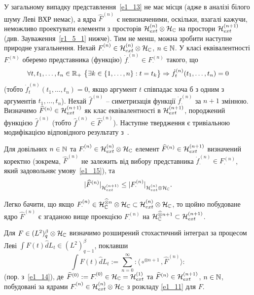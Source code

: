 У загальному випадку представлення~\eqref{e1_13} не має місця (адже в аналізі білого шуму
Леві ВХР немає), а ядра $\widehat F^{(n)}$ є невизначеними, оскільки, взагалі кажучи,
неможливо проектувати елементи з просторів
$\mathcal{H}_{ext}^{(n)}\otimes\mathcal{H}_{\mathbb{C}}$ на простори $\mathcal{H}_{ext}^{(n+1)}$
(див. Зауваження~\ref{r1_5_1} нижче). Тим не менш, можна зробити наступне природне узагальнення.
Нехай $F^{(n)}_\cdot\in\mathcal{H}_{ext}^{(n)}\otimes\mathcal{H}_{\mathbb{C}}$, $n\in\mathbb{N}$.
У класі еквівалентності $F^{(n)}_\cdot$ оберемо представника (функцію)
$\dot f^{(n)}_\cdot\in F^{(n)}_\cdot$ такого, що
\begin{equation}\label{e1_15}
\forall t,t_1,\dots,t_n\in\mathbb{R}_+
\ \big\{\exists k\in\{1,\dots,n\} : t=t_k\big\}
\Rightarrow \dot f^{(n)}_t(t_1,\dots,t_n)=0
\end{equation}
(тобто $\dot f^{(n)}_t(t_1,\dots,t_n)=0$, якщо аргумент $t$ співпадає хоча б з одним
з аргументів $t_1,\dots,t_n$).
Нехай $\widehat f^{(n)}$ -- симетризація функції
$\dot f^{(n)}_\cdot$ за $n+1$ змінною. Визначимо
$\widehat F^{(n)}\in\mathcal{H}_{ext}^{(n+1)}$ як клас еквівалентності в
$\mathcal{H}_{ext}^{(n+1)}$, породжений функцією $\widehat f^{(n)}$ (тобто
$\widehat f^{(n)}\in\widehat F^{(n)}$).
Наступне твердження є тривіальною модифікацією відповідного результату з~\cite{K13}.
\begin{sublemma}
Для довільних $n\in\mathbb{N}$ та
$F^{(n)}_\cdot\in\mathcal{H}_{ext}^{(n)}\otimes\mathcal{H}_{\mathbb{C}}$ елемент
$\widehat F^{(n)}\in\mathcal{H}_{ext}^{(n+1)}$ визначений коректно (зокрема,
$\widehat F^{(n)}$ не залежить від вибору представника
$\dot f^{(n)}_\cdot\in F^{(n)}_\cdot$, який задовольняє умову~\eqref{e1_15}), та
\begin{equation}\label{e1_16}
|\widehat F^{(n)}|_{\mathcal{H}_{ext}^{(n+1)}}
\leq |F^{(n)}_\cdot|_{\mathcal{H}_{ext}^{(n)}\otimes\mathcal{H}_{\mathbb{C}}}.
\end{equation}
\end{sublemma}
\begin{subremark}
Легко бачити, що якщо
$F^{(n)}_\cdot\in\mathcal{H}_{\mathbb{C}}^{\widehat\otimes n}\otimes\mathcal{H}_{\mathbb{C}}
\subset\mathcal{H}_{ext}^{(n)}\otimes\mathcal{H}_{\mathbb{C}}$, то щойно побудоване ядро
$\widehat F^{(n)}$ є згаданою вище проекцією $F^{(n)}_\cdot$ на
$\mathcal{H}_{\mathbb{C}}^{\widehat\otimes n+1}\subset\mathcal{H}_{ext}^{(n+1)}$.
\end{subremark}
\begin{subdefinition}
Для $F\in (L^2)^\beta_q\otimes\mathcal{H}_{\mathbb{C}}$
визначимо розширений стохастичний інтеграл за процесом Леві
$\int F(t)\widehat dL_t\in (L^2)^\beta_{q-1}$, поклавши
\begin{equation}\label{e1_17}
\int F(t)\widehat d L_t
:=\sum_{n=0}^\infty{:\!\langle}\circ^{\otimes n+1},
\widehat F^{(n)}{\rangle\!:}
\end{equation}
(пор. з~\eqref{e1_14}), де $\widehat F^{(0)}:=F^{(0)}_\cdot
\in\mathcal{H}_{\mathbb{C}}=\mathcal{H}_{ext}^{(1)}$ та
$\widehat F^{(n)}\in\mathcal{H}_{ext}^{(n+1)}$, $n\in\mathbb{N}$, побудовані за ядрами
$F^{(n)}_\cdot\in\mathcal{H}_{ext}^{(n)}\otimes\mathcal{H}_{\mathbb{C}}$ з розкладу
\eqref{e1_11} для $F$.
\end{subdefinition}
